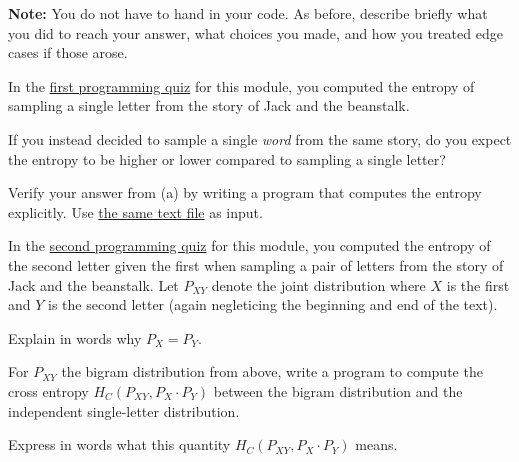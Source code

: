 \documentclass[a4paper,10pt,landscape,twocolumn]{scrartcl}
\begin{document}
\begin{exercise}[Programming (8pt)]
	\textbf{Note:} You do not have to hand in your code. As before, describe briefly what you did to reach your answer, what choices you made, and how you treated edge cases if those arose.
	\begin{subex}[(1pt)]
	In the \href{https://canvas.uva.nl/courses/2205/assignments/5648}{first programming quiz} for this module, you computed the entropy of sampling a single letter from the story of Jack and the beanstalk.
	
	If you instead decided to sample a single \emph{word} from the same story, do you expect the entropy to be higher or lower compared to sampling a single letter?
	\end{subex}
	\begin{subex}[(3pt)]
	Verify your answer from (a) by writing a program that computes the entropy explicitly. Use \href{https://canvas.uva.nl/files/63724/download?download_frd=1}{the same text file} as input.
      \end{subex}
      \begin{subex}[(1pt)]
	In the \href{https://canvas.uva.nl/courses/2205/assignments/5668}{second programming quiz} for this module, you computed the entropy of the second letter given the first when sampling a pair of letters from the story of Jack and the beanstalk. Let $P_{XY}$ denote the joint distribution where $X$ is the first and $Y$ is the second letter (again negleticing the beginning and end of the text).

        Explain in words why $P_X = P_Y$.
      \end{subex}
      \begin{subex}[(2pt)] For $P_{XY}$ the bigram distribution from above, write a program to compute the cross entropy $H_C(P_{XY} , P_X \cdot P_Y)$ between the bigram distribution and the independent single-letter distribution. 
	\end{subex}
	\begin{subex}[(1pt)]
Express in words what this quantity  $H_C(P_{XY} , P_X \cdot P_Y)$ means.
	\end{subex}
\end{exercise}
\end{document}
